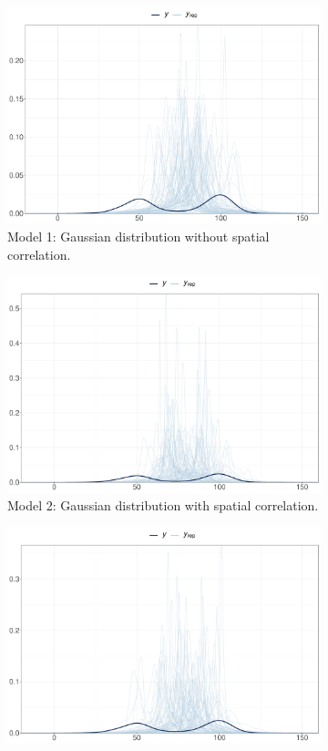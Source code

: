 \documentclass[a4paper]{article}   	%
\begin{document}
	\begin{figure}[!htp]
		\centering
		\begin{subfigure}[t]{0.45\textwidth}
			\includegraphics[width=\linewidth]{Images/prior_GSRNS}
			\caption{Model 1: Gaussian distribution without spatial correlation.}
		\end{subfigure}
		\begin{subfigure}[t]{0.45\textwidth}
			\includegraphics[width=\linewidth]{Images/prior_GSRand}
			\caption{Model 2: Gaussian distribution with spatial correlation.}
		\end{subfigure}
		\begin{subfigure}[t]{0.45\textwidth}
			\includegraphics[width=\linewidth]{Images/prior_STRNS}

\end{subfigure}
\end{figure}
\end{document}
